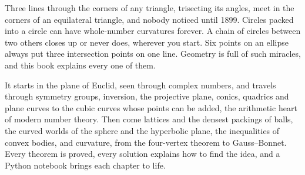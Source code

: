 Three lines through the corners of any triangle, trisecting its angles, meet in the corners of an
equilateral triangle, and nobody noticed until 1899. Circles packed into a circle can have whole-number
curvatures forever. A chain of circles between two others closes up or never does, wherever you start. Six
points on an ellipse always put three intersection points on one line. Geometry is full of such miracles, and
this book explains every one of them.

It starts in the plane of Euclid, seen through complex numbers, and travels through symmetry groups,
inversion, the projective plane, conics, quadrics and plane curves to the cubic curves whose points can be
added, the arithmetic heart of modern number theory. Then come lattices and the densest packings of balls,
the curved worlds of the sphere and the hyperbolic plane, the inequalities of convex bodies, and curvature,
from the four-vertex theorem to Gauss--Bonnet. Every theorem is proved, every solution explains how to find
the idea, and a Python notebook brings each chapter to life.
